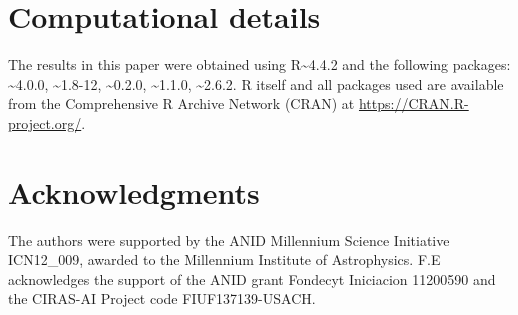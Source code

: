 \section{Computational details}\label{computational-details}

The results in this paper were obtained using R\textasciitilde4.4.2 and the following packages: \textasciitilde4.0.0, \textasciitilde1.8-12, \textasciitilde0.2.0, \textasciitilde1.1.0, \textasciitilde2.6.2. R itself and all packages used are available from the Comprehensive R Archive Network (CRAN) at \url{https://CRAN.R-project.org/}.

\section*{Acknowledgments}\label{acknowledgments}

The authors were supported by the ANID Millennium Science Initiative ICN12\_009, awarded to the Millennium Institute of Astrophysics. F.E acknowledges the support of the ANID grant Fondecyt Iniciacion 11200590 and the CIRAS-AI Project code FIUF137139-USACH.

\renewcommand{\refname}{References}



\address{%
Felipe Elorrieta\\
Universidad de Santiago de Chile\\%
Department of Mathematics and Computer Science\\ Av. Libertador Bernardo O'Higgins 3663, Estación Central, Santiago, Chile\\
%
%
\textit{ORCID: \href{https://orcid.org/0000-0002-1835-7433}{0000-0002-1835-7433}}\\%
\href{mailto:felipe.elorrieta@usach.cl}{\nolinkurl{felipe.elorrieta@usach.cl}}%
}

\address{%
Susana Eyheramendy\\
Universidad Adolfo Ibañez\\%
Faculty of Engineering and Sciences\\ Diagonal Las Torres 2700, Peñalolén, Santiago, Chile\\
%
%
\textit{ORCID: \href{https://orcid.org/0000-0003-4723-9660}{0000-0003-4723-9660}}\\%
\href{mailto:susana.eyheramendy@gmail.com}{\nolinkurl{susana.eyheramendy@gmail.com}}%
}

